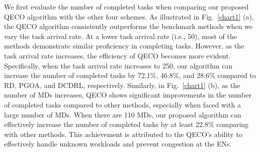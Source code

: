 \documentclass[10pt, journal,letterpaper]{IEEEtran}
\begin{document}
















We first evaluate the number of completed tasks when comparing our proposed QECO algorithm with the other four schemes. As illustrated in Fig.~\ref{chart1} (a), the QECO algorithm consistently outperforms the benchmark methods when we vary the task arrival rate. At a lower task arrival rate (i.e., 50), most of the methods demonstrate similar proficiency in completing tasks. However, as the task arrival rate increases, the efficiency of QECO becomes more evident. Specifically, when the task arrival rate increases to 250, our algorithm can increase the number of completed tasks by 72.1\%, 46.8\%, and 28.6\% compared to RD, PGOA, and DCDRL, respectively.
Similarly, in Fig.~\ref{chart1} (b), as the number of MDs increases, QECO shows significant improvements in the number of completed tasks compared to other methods, especially when faced with a large number of MDs. When there are 110 MDs, our proposed algorithm can effectively increase the number of completed tasks by at least 22.8\% comparing with other methods. This achievement is attributed to the QECO's ability to effectively handle unknown workloads and prevent congestion at the ENs.
\end{document}
